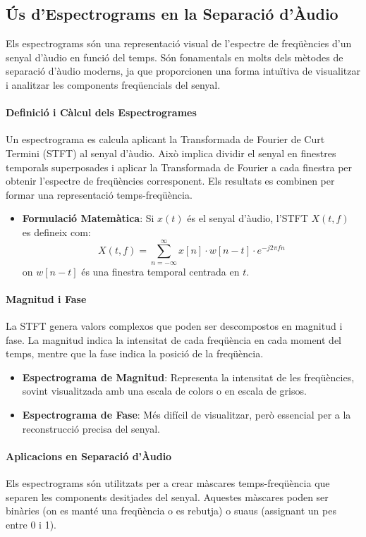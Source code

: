 \documentclass[10pt,a4paper,twocolumn,twoside]{article}
\begin{document}
\subsection{Ús d'Espectrograms en la Separació d'Àudio}
Els espectrograms són una representació visual de l'espectre de freqüències d'un senyal d'àudio en funció del temps. Són fonamentals en molts dels mètodes de separació d'àudio moderns, ja que proporcionen una forma intuïtiva de visualitzar i analitzar les components freqüencials del senyal.

\paragraph{Definició i Càlcul dels Espectrogrames}
Un espectrograma es calcula aplicant la Transformada de Fourier de Curt Termini (STFT) al senyal d'àudio. Això implica dividir el senyal en finestres temporals superposades i aplicar la Transformada de Fourier a cada finestra per obtenir l'espectre de freqüències corresponent. Els resultats es combinen per formar una representació temps-freqüència.

\begin{itemize}
    \item \textbf{Formulació Matemàtica}: Si $x(t)$ és el senyal d'àudio, l'STFT $X(t, f)$ es defineix com:
    \[
    X(t, f) = \sum_{n=-\infty}^{\infty} x[n] \cdot w[n-t] \cdot e^{-j2\pi fn}
    \]
    on $w[n-t]$ és una finestra temporal centrada en $t$.
\end{itemize}

\paragraph{Magnitud i Fase}
La STFT genera valors complexos que poden ser descompostos en magnitud i fase. La magnitud indica la intensitat de cada freqüència en cada moment del temps, mentre que la fase indica la posició de la freqüència.

\begin{itemize}
    \item \textbf{Espectrograma de Magnitud}: Representa la intensitat de les freqüències, sovint visualitzada amb una escala de colors o en escala de grisos.
    \item \textbf{Espectrograma de Fase}: Més difícil de visualitzar, però essencial per a la reconstrucció precisa del senyal.
\end{itemize}

\paragraph{Aplicacions en Separació d'Àudio}
Els espectrograms són utilitzats per a crear màscares temps-freqüència que separen les components desitjades del senyal. Aquestes màscares poden ser binàries (on es manté una freqüència o es rebutja) o suaus (assignant un pes entre 0 i 1).
\end{document}

